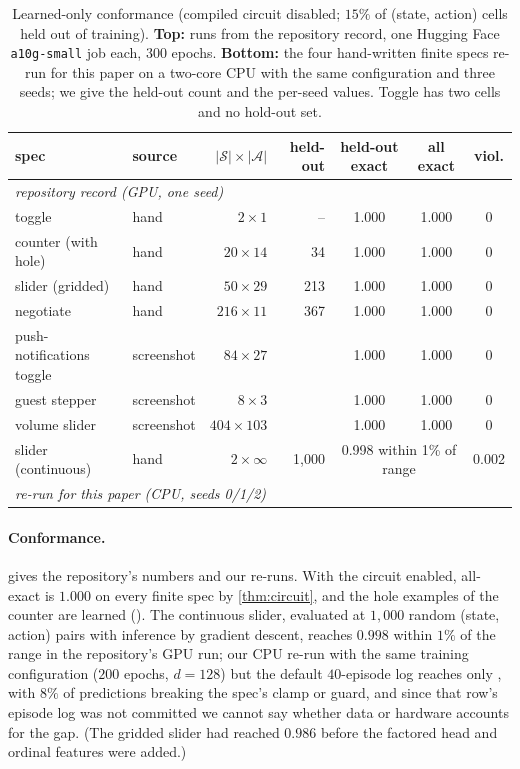 \documentclass{article}
\theoremstyle{plain}
\theoremstyle{definition}
\theoremstyle{remark}
\newcommand{\Sset}{\mathcal{S}}
\newcommand{\Aset}{\mathcal{A}}
\begin{document}
\begin{table}[t]
\centering
\caption{Learned-only conformance (compiled circuit disabled; $15\%$ of (state, action) cells held out of training). \textbf{Top:} runs from the repository record, one Hugging Face \texttt{a10g-small} job each, $300$ epochs. \textbf{Bottom:} the four hand-written finite specs re-run for this paper on a two-core CPU with the same configuration and three seeds; we give the held-out count and the per-seed values. Toggle has two cells and no hold-out set.}
\label{tab:main}
\footnotesize
\setlength{\tabcolsep}{4pt}
\begin{tabular}{llrrccc}
\toprule
spec & source & $|\Sset|\times|\Aset|$ & held-out & held-out exact & all exact & viol.\\
\midrule
\multicolumn{7}{l}{\emph{repository record (GPU, one seed)}}\\
toggle & hand & $2\times1$ & -- & 1.000 & 1.000 & 0\\
counter (with hole) & hand & $20\times14$ & 34 & 1.000 & 1.000 & 0\\
slider (gridded) & hand & $50\times29$ & 213 & 1.000 & 1.000 & 0\\
negotiate & hand & $216\times11$ & 367 & 1.000 & 1.000 & 0\\
push-notifications toggle & screenshot & $84\times27$ & & 1.000 & 1.000 & 0\\
guest stepper & screenshot & $8\times3$ & & 1.000 & 1.000 & 0\\
volume slider & screenshot & $404\times103$ & & 1.000 & 1.000 & 0\\
slider (continuous) & hand & $2\times\infty$ & 1{,}000 & \multicolumn{2}{c}{0.998 within 1\% of range} & 0.002\\
\midrule
\multicolumn{7}{l}{\emph{re-run for this paper (CPU, seeds 0/1/2)}}\\

\end{tabular}
\end{table}

\paragraph{Conformance.}  gives the repository's numbers and our re-runs. \mainsummary{} With the circuit enabled, all-exact is $1.000$ on every finite spec by \cref{thm:circuit}, and the hole examples of the counter are learned (\holesummary{}). The continuous slider, evaluated at $1{,}000$ random (state, action) pairs with inference by gradient descent, reaches $0.998$ within $1\%$ of the range in the repository's GPU run; our CPU re-run with the same training configuration ($200$ epochs, $d=128$) but the default $40$-episode log reaches only \contexactcpu{}, with $8\%$ of predictions breaking the spec's clamp or guard, and since that row's episode log was not committed we cannot say whether data or hardware accounts for the gap. (The gridded slider had reached $0.986$ before the factored head and ordinal features were added.)
\end{document}
